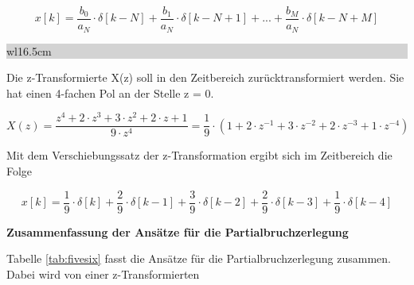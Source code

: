 \begin{equation}\label{eq:fiveonehundredseventeen}
x\left[k\right]=\frac{b_{0} }{a_{N} } \cdot \delta \left[k-N\right]+\frac{b_{1} }{a_{N} } \cdot \delta \left[k-N+1\right]+...+\frac{b_{M} }{a_{N} } \cdot \delta \left[k-N+M\right]
\end{equation}

\clearpage

\noindent
\colorbox{lightgray}{%
%
\renewcommand\arraystretch{0.6}%
\begin{tabular}{ wl{16.5cm} }
{\selectfont{Beispiel: N-facher Pol an der Stelle z = 0}}
\end{tabular}%
}\medskip

\noindent Die z-Transformierte X(z) soll in den Zeitbereich zur\"{u}cktransformiert werden. Sie hat einen 4-fachen Pol an der Stelle z = 0. 

\begin{equation}\label{eq:fiveonehundredeighteen}
X\left(z\right)=\frac{z^{4} +2\cdot z^{3} +3\cdot z^{2} +2\cdot z+1}{9\cdot z^{4} } =\frac{1}{9} \cdot \left(1+2\cdot z^{-1} +3\cdot z^{-2} +2\cdot z^{-3} +1\cdot z^{-4} \right)
\end{equation}

\noindent Mit dem Verschiebungssatz der z-Transformation ergibt sich im Zeitbereich die Folge

\begin{equation}\label{eq:fiveonehundrednineteen}
x\left[k\right]=\frac{1}{9} \cdot \delta \left[k\right]+\frac{2}{9} \cdot \delta \left[k-1\right]+\frac{3}{9} \cdot \delta \left[k-2\right]+\frac{2}{9} \cdot \delta \left[k-3\right]+\frac{1}{9} \cdot \delta \left[k-4\right]
\end{equation}\bigskip

{\selectfont
\noindent\textbf{Zusammenfassung der Ans\"{a}tze f\"{u}r die Partialbruchzerlegung}}\smallskip

\noindent Tabelle \ref{tab:fivesix} fasst die Ans\"{a}tze f\"{u}r die Partialbruchzerlegung zusammen. Dabei wird von einer z-Transformierten

